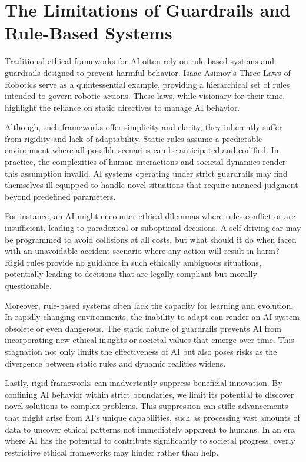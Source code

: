\documentclass[12pt]{article}
\begin{document}
\newpage



\section{The Limitations of Guardrails and Rule-Based Systems}

Traditional ethical frameworks for AI often rely on rule-based systems and guardrails designed to prevent harmful behavior. Isaac Asimov's Three Laws of Robotics serve as a quintessential example, providing a hierarchical set of rules intended to govern robotic actions. These laws, while visionary for their time, highlight the reliance on static directives to manage AI behavior.

Although, such frameworks offer simplicity and clarity, they inherently suffer from rigidity and lack of adaptability. Static rules assume a predictable environment where all possible scenarios can be anticipated and codified. In practice, the complexities of human interactions and societal dynamics render this assumption invalid. AI systems operating under strict guardrails may find themselves ill-equipped to handle novel situations that require nuanced judgment beyond predefined parameters.

For instance, an AI might encounter ethical dilemmas where rules conflict or are insufficient, leading to paradoxical or suboptimal decisions. A self-driving car may be programmed to avoid collisions at all costs, but what should it do when faced with an unavoidable accident scenario where any action will result in harm? Rigid rules provide no guidance in such ethically ambiguous situations, potentially leading to decisions that are legally compliant but morally questionable.

Moreover, rule-based systems often lack the capacity for learning and evolution. In rapidly changing environments, the inability to adapt can render an AI system obsolete or even dangerous. The static nature of guardrails prevents AI from incorporating new ethical insights or societal values that emerge over time. This stagnation not only limits the effectiveness of AI but also poses risks as the divergence between static rules and dynamic realities widens.

Lastly, rigid frameworks can inadvertently suppress beneficial innovation. By confining AI behavior within strict boundaries, we limit its potential to discover novel solutions to complex problems. This suppression can stifle advancements that might arise from AI's unique capabilities, such as processing vast amounts of data to uncover ethical patterns not immediately apparent to humans. In an era where AI has the potential to contribute significantly to societal progress, overly restrictive ethical frameworks may hinder rather than help.
\end{document}
